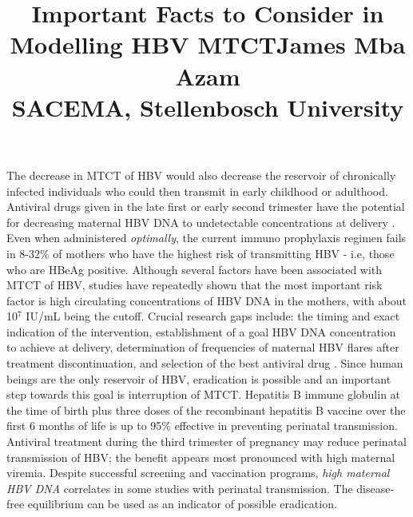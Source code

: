 \documentclass[10pt,a4paper]{article}
\begin{document}
	\begin{titlepage}
		\title{Important Facts to Consider in Modelling HBV MTCT\newline\newline\large{James Mba Azam\\SACEMA, Stellenbosch University}}
		\maketitle
	\end{titlepage}
	\begin{outline}
		\1 The decrease in MTCT
		of HBV would also decrease the reservoir of chronically
		infected individuals who could then transmit in early
		childhood or adulthood\cite{thio2015global}. 
		\1 Antiviral drugs given in the late first or early second
		trimester have the potential for decreasing maternal HBV
		DNA to undetectable concentrations at delivery \cite{thio2015global}.
		\1 Even when administered \textit{optimally}, the current
		immuno prophylaxis regimen fails in 8-32\% of mothers
		who have the highest risk of transmitting HBV - i.e,
		those who are HBeAg positive\cite{thio2015global}.
		\1 Although several factors have been associated with MTCT of HBV,
		studies have repeatedly shown that the most important
		risk factor is high circulating concentrations of HBV
		DNA in the mothers, with about 10$^7$ IU/mL being the
		cutoff\cite{thio2015global}.
		\1 Crucial research gaps include:
		\2  the timing and
		exact indication of the intervention,
		\2 establishment of a
		goal HBV DNA concentration to achieve at delivery,
		\2 determination of frequencies of maternal HBV flares
		after treatment discontinuation, and 
		\2 selection of the best antiviral drug
		\cite{thio2015global}.
		\1 Since human beings are the only reservoir of HBV,
		eradication is possible and an important step towards this
		goal is interruption of MTCT\cite{thio2015global}.
		\1 Hepatitis B immune globulin at the time of birth plus
		three doses of the recombinant hepatitis B vaccine over
		the first 6 months of life is up to 95\% effective in
		preventing perinatal transmission\cite{tran2009management}.
		\1 Antiviral treatment during the third trimester of pregnancy
		may reduce perinatal transmission of HBV; the benefit
		appears most pronounced with high maternal viremia\cite{tran2009management}.
		\1 Despite successful screening and vaccination programs,
	\textit{high maternal HBV DNA} correlates in some studies
		with perinatal transmission\cite{tran2009management}.
		\1 The disease-free equilibrium can be used as an indicator of possible eradication.
	\end{outline}
\end{document}
